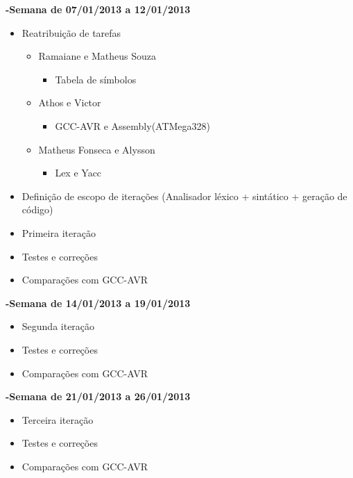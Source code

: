 \documentclass{abnt}
\begin{document}
    \textbf{-Semana de 07/01/2013 a 12/01/2013}
        \begin{itemize}
            \item Reatribuição de tarefas
                \begin{itemize}
                    \item Ramaiane e Matheus Souza
                        \begin{itemize}
                            \item Tabela de símbolos
                        \end{itemize}
                    \item Athos e Victor
                        \begin{itemize}
                            \item GCC-AVR e Assembly(ATMega328)
                        \end{itemize}
                    \item Matheus Fonseca e Alysson
                        \begin{itemize}
                            \item Lex e Yacc
                        \end{itemize}
                \end{itemize}
            \item Definição de escopo de iterações (Analisador léxico + sintático + geração de código)
            \item Primeira iteração
            \item Testes e correções
            \item Comparações com GCC-AVR
        \end{itemize}
    \textbf{-Semana de 14/01/2013 a 19/01/2013}
        \begin{itemize}
            \item Segunda iteração
            \item Testes e correções
            \item Comparações com GCC-AVR
        \end{itemize}
    \textbf{-Semana de 21/01/2013 a 26/01/2013}
        \begin{itemize}
            \item Terceira iteração
            \item Testes e correções
            \item Comparações com GCC-AVR
        \end{itemize}
\end{document}
